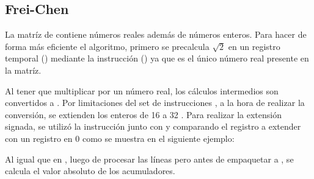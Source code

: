 \vspace{5mm}
\subsection{Frei-Chen}
	La matríz de  contiene números reales además de números enteros. Para hacer de forma más eficiente el algoritmo, 
primero se precalcula $\sqrt{2}$ en un registro temporal () mediante la instrucción  () ya que es el único número real presente en la matríz.

\vspace{5mm}
\begin{center}
\end{center}

Al tener que multiplicar por un número real, los cálculos intermedios son convertidos a . Por limitaciones del set de instrucciones
, a la hora de realizar la conversión, se extienden los enteros de 16  a 32 . Para realizar la extensión signada,
se utilizó la instrucción  junto con  y  comparando el registro a extender con un registro en 0 como se 
muestra en el siguiente ejemplo:
\begin{center}
\end{center}
Al igual que en , luego de procesar las líneas pero antes de empaquetar a , se calcula el valor absoluto de 
los acumuladores.


